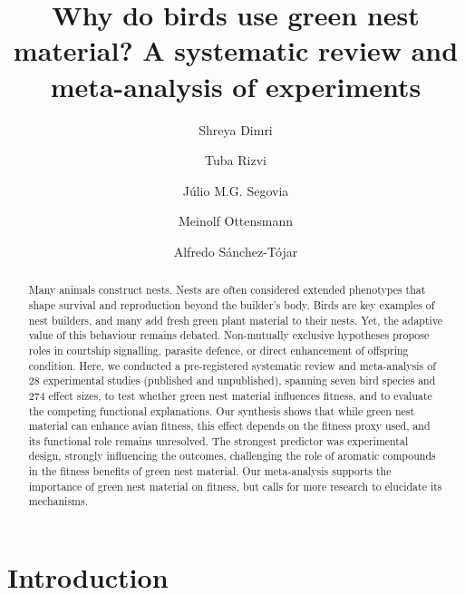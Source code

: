 \documentclass[
  number,
  review,
  onecolumn]{elsarticle}
\begin{document}
\begin{frontmatter}
\title{Why do birds use green nest material? A systematic review and
meta-analysis of experiments}
\author[1]{Shreya Dimri%
%
}
\author[1]{Tuba Rizvi%
%
}

\author[1]{Júlio M.G. Segovia%
%
}

\author[2]{Meinolf Ottensmann%
%
}

\author[1]{Alfredo Sánchez-Tójar%
%
}








        
\begin{abstract}
Many animals construct nests. Nests are often considered extended
phenotypes that shape survival and reproduction beyond the builder's
body. Birds are key examples of nest builders, and many add fresh green
plant material to their nests. Yet, the adaptive value of this behaviour
remains debated. Non-mutually exclusive hypotheses propose roles in
courtship signalling, parasite defence, or direct enhancement of
offspring condition. Here, we conducted a pre-registered systematic
review and meta-analysis of 28 experimental studies (published and
unpublished), spanning seven bird species and 274 effect sizes, to test
whether green nest material influences fitness, and to evaluate the
competing functional explanations. Our synthesis shows that while green
nest material can enhance avian fitness, this effect depends on the
fitness proxy used, and its functional role remains unresolved. The
strongest predictor was experimental design, strongly influencing the
outcomes, challenging the role of aromatic compounds in the fitness
benefits of green nest material. Our meta-analysis supports the
importance of green nest material on fitness, but calls for more
research to elucidate its mechanisms.
\end{abstract}





\end{frontmatter}
    
\linenumbers


\section{Introduction}\label{introduction}
\end{document}
